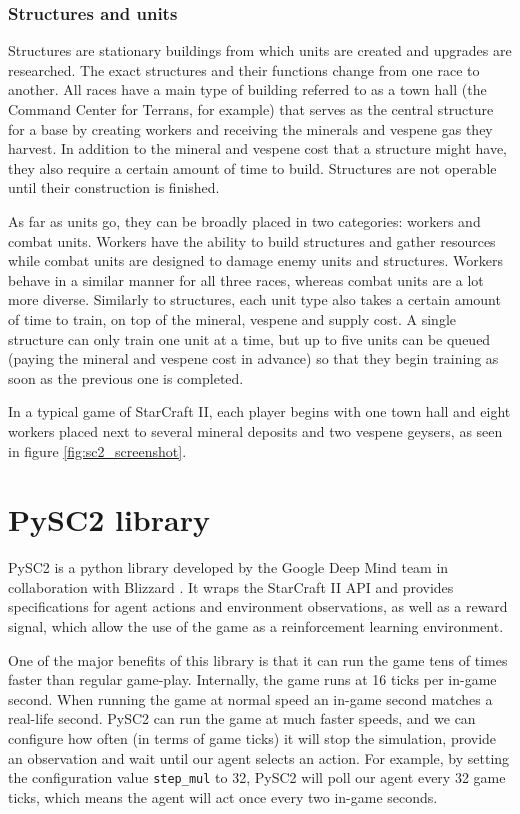 \subsubsection{Structures and units}

Structures are stationary buildings from which units are created and upgrades are researched. The exact structures and their functions change from one race to another. All races have a main type of building referred to as a town hall (the Command Center for Terrans, for example) that serves as the central structure for a base by creating workers and receiving the minerals and vespene gas they harvest. In addition to the mineral and vespene cost that a structure might have, they also require a certain amount of time to build. Structures are not operable until their construction is finished.

As far as units go, they can be broadly placed in two categories: workers and combat units. Workers have the ability to build structures and gather resources while combat units are designed to damage enemy units and structures. Workers behave in a similar manner for all three races, whereas combat units are a lot more diverse. Similarly to structures, each unit type also takes a certain amount of time to train, on top of the mineral, vespene and supply cost. A single structure can only train one unit at a time, but up to five units can be queued (paying the mineral and vespene cost in advance) so that they begin training as soon as the previous one is completed.

In a typical game of StarCraft II, each player begins with one town hall and eight workers placed next to several mineral deposits and two vespene geysers, as seen in figure \ref{fig:sc2_screenshot}.

\section{PySC2 library}

PySC2 is a python library developed by the Google Deep Mind team in collaboration with Blizzard \cite{Vinyals:2017}. It wraps the StarCraft II API and provides specifications for agent actions and environment observations, as well as a reward signal, which allow the use of the game as a reinforcement learning environment.

One of the major benefits of this library is that it can run the game tens of times faster than regular game-play. Internally, the game runs at 16 ticks per in-game second. When running the game at normal speed an in-game second matches a real-life second. PySC2 can run the game at much faster speeds, and we can configure how often (in terms of game ticks) it will stop the simulation, provide an observation and wait until our agent selects an action. For example, by setting the configuration value \texttt{step\_mul} to 32, PySC2 will poll our agent every 32 game ticks, which means the agent will act once every two in-game seconds.

